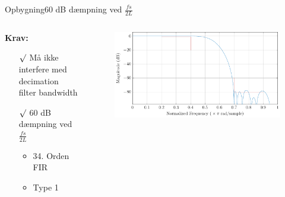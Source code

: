 \begin{frame}{Opbygning}{60 dB dæmpning ved $\frac{fs}{2L}$}
\begin{columns}
  \begin{column}{0.4\textwidth}
\textbf{Krav:}
\begin{itemize}
\item[$\surd$] Må ikke interfere med decimation filter bandwidth
\item[$\surd$] \alert{60 dB dæmpning ved $\frac{fs}{2L}$}
\begin{itemize}
\item 34. Orden FIR
\item Type 1
\end{itemize}
\end{itemize}
  \end{column}
  \begin{column}{0.6\textwidth}
\begin{figure}
	\centering
	\includegraphics[width=1\textwidth]{IntMag}
\end{figure}
  \end{column}
\end{columns}
\end{frame}